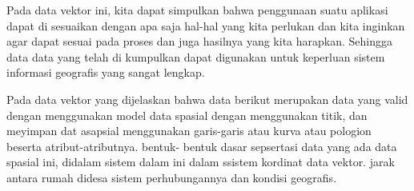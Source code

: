 Pada data vektor ini, kita dapat simpulkan bahwa penggunaan suatu aplikasi dapat di sesuaikan dengan apa saja hal-hal yang kita perlukan dan kita inginkan agar dapat sesuai pada proses dan juga hasilnya yang kita harapkan. Sehingga data data yang telah di kumpulkan dapat digunakan untuk keperluan sistem informasi geografis yang sangat lengkap.

Pada data vektor yang dijelaskan bahwa data berikut merupakan data yang valid dengan menggunakan model data spasial dengan menggunakan titik, dan meyimpan dat asapsial menggunakan garis-garis atau kurva atau pologion beserta atribut-atributnya. bentuk- bentuk dasar sepsertasi data yang ada data spasial ini, didalam sistem dalam ini dalam ssistem kordinat data vektor. jarak antara rumah didesa sistem perhubungannya dan kondisi geografis.
\cite{Budiyanto2002sistem}
